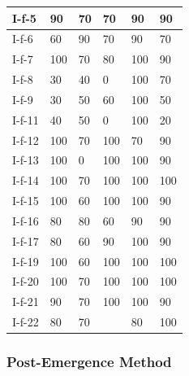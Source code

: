 \documentclass[11pt,a4paper]{article}
\begin{document}
\begin{table}[h]
\begin{tabular}{|l|l|l|l|l|l|}
I-f-5 & 90 & 70 & 70 & 90 & 90 \\ \hline
I-f-6 & 60 & 90 & 70 & 90 & 70 \\ \hline
I-f-7 & 100 & 70 & 80 & 100 & 90 \\ \hline
I-f-8 & 30 & 40 & 0 & 100 & 70 \\ \hline
I-f-9 & 30 & 50 & 60 & 100 & 50 \\ \hline
I-f-11 & 40 & 50 & 0 & 100 & 20 \\ \hline
I-f-12 & 100 & 70 & 100 & 70 & 90 \\ \hline
I-f-13 & 100 & 0 & 100 & 100 & 90 \\ \hline
I-f-14 & 100 & 70 & 100 & 100 & 100 \\ \hline
I-f-15 & 100 & 60 & 100 & 100 & 90 \\ \hline
I-f-16 & 80 & 80 & 60 & 90 & 90 \\ \hline
I-f-17 & 80 & 60 & 90 & 100 & 90 \\ \hline
I-f-19 & 100 & 60 & 100 & 100 & 100 \\ \hline
I-f-20 & 100 & 70 & 100 & 100 & 100 \\ \hline
I-f-21 & 90 & 70 & 100 & 100 & 90 \\ \hline
I-f-22 & 80 & 70 &  & 80 & 100 \\ \hline
\end{tabular}
\end{table}

\subsubsection{Post-Emergence Method}
\end{document}
